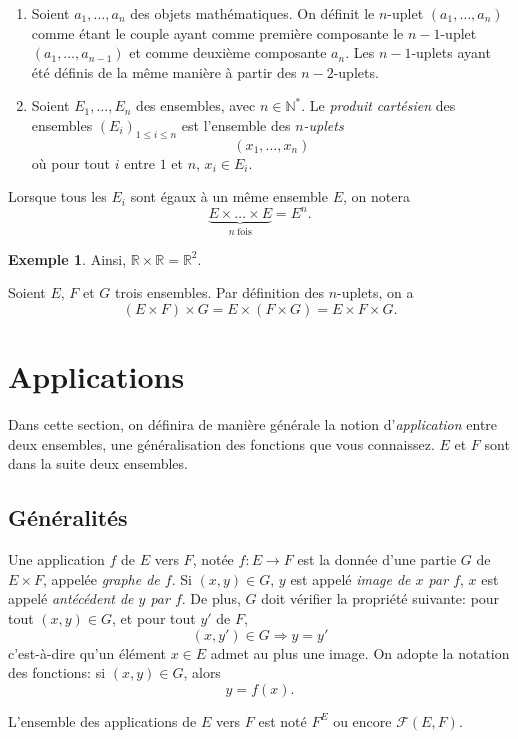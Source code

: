\documentclass[11pt]{article}
\newcommand{\N}{\mathbb N}
\newcommand{\R}{\mathbb R}
\theoremstyle{definition}
\newtheorem{exe}{Exemple}
\theoremstyle{remark}
\begin{document}
\begin{defn}[Généralisation]\leavevmode
	\begin{enumerate}
		\item Soient $a_1,\ldots,a_n$ des objets mathématiques. On définit le $n$-uplet $(a_1,\ldots,a_n)$ comme étant le couple ayant comme première composante le $n-1$-uplet $(a_1,\ldots,a_{n-1})$ et comme deuxième composante $a_n$. Les $n-1$-uplets ayant été définis de la même manière à partir des $n-2$-uplets.
		\item Soient $E_1,\ldots,E_n$ des ensembles, avec $n\in\N^*$. Le \textit{produit cartésien} des ensembles $(E_i)_{1\leq i\leq n}$ est l'ensemble des \textit{$n$-uplets}
		\[ (x_1,\ldots,x_n)
		\]
		où pour tout $i$ entre $1$ et $n$, $x_i\in E_i$.
	\end{enumerate}
\end{defn}

Lorsque tous les $E_i$ sont égaux à un même ensemble $E$, on notera
\[
\underbrace{E\times\ldots \times E}_{n\; \text{fois}} = E^n.
\]

\begin{exe}
	Ainsi, $\R\times\R = \R^2$.
\end{exe}

\begin{prop}
	Soient $E$, $F$ et $G$ trois ensembles. Par définition des $n$-uplets, on a 
	\[(E\times F)\times G = E\times(F\times G) = E\times F\times G. \]
\end{prop}


\section{Applications}

Dans cette section, on définira de manière générale la notion d'\textit{application} entre deux ensembles, une généralisation des fonctions que vous connaissez. $E$ et $F$ sont dans la suite deux ensembles.

\subsection{Généralités}

\begin{defn}
	Une application $f$ de $E$ vers $F$, notée $f:E\longrightarrow F$ est la donnée d'une partie $G$ de $E\times F$, appelée \textit{graphe de $f$}. Si $(x,y)\in G$, $y$ est appelé \textit{image de $x$ par $f$}, $x$ est appelé \textit{antécédent de $y$ par $f$}. De plus, $G$ doit vérifier la propriété suivante:
	pour tout $(x,y)\in G$, et pour tout $y'$ de $F$,
	\[
	(x,y')\in G \Rightarrow y=y'
	\]
	c'est-à-dire qu'un élément $x\in E$ admet au plus une image. On adopte la notation des fonctions: si $(x,y)\in G$, alors
	\[y=f(x).\]
	
	L'ensemble des applications de $E$ vers $F$ est noté $F^E$ ou encore \(\mathcal{F}(E,F)\).
\end{defn}
\end{document}
